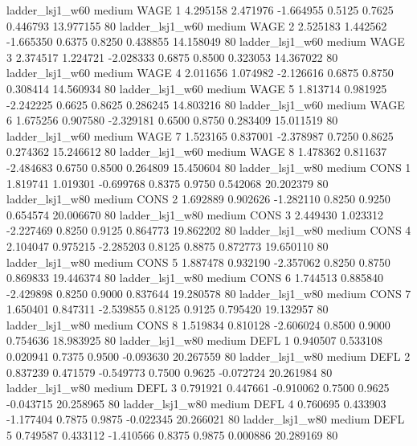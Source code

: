        ladder_lsj1_w60     medium     WAGE                 1  4.295158 2.471976 -1.664955 0.5125 0.7625  0.446793   13.977155 80
       ladder_lsj1_w60     medium     WAGE                 2  2.525183 1.442562 -1.665350 0.6375 0.8250  0.438855   14.158049 80
       ladder_lsj1_w60     medium     WAGE                 3  2.374517 1.224721 -2.028333 0.6875 0.8500  0.323053   14.367022 80
       ladder_lsj1_w60     medium     WAGE                 4  2.011656 1.074982 -2.126616 0.6875 0.8750  0.308414   14.560934 80
       ladder_lsj1_w60     medium     WAGE                 5  1.813714 0.981925 -2.242225 0.6625 0.8625  0.286245   14.803216 80
       ladder_lsj1_w60     medium     WAGE                 6  1.675256 0.907580 -2.329181 0.6500 0.8750  0.283409   15.011519 80
       ladder_lsj1_w60     medium     WAGE                 7  1.523165 0.837001 -2.378987 0.7250 0.8625  0.274362   15.246612 80
       ladder_lsj1_w60     medium     WAGE                 8  1.478362 0.811637 -2.484683 0.6750 0.8500  0.264809   15.450604 80
       ladder_lsj1_w80     medium     CONS                 1  1.819741 1.019301 -0.699768 0.8375 0.9750  0.542068   20.202379 80
       ladder_lsj1_w80     medium     CONS                 2  1.692889 0.902626 -1.282110 0.8250 0.9250  0.654574   20.006670 80
       ladder_lsj1_w80     medium     CONS                 3  2.449430 1.023312 -2.227469 0.8250 0.9125  0.864773   19.862202 80
       ladder_lsj1_w80     medium     CONS                 4  2.104047 0.975215 -2.285203 0.8125 0.8875  0.872773   19.650110 80
       ladder_lsj1_w80     medium     CONS                 5  1.887478 0.932190 -2.357062 0.8250 0.8750  0.869833   19.446374 80
       ladder_lsj1_w80     medium     CONS                 6  1.744513 0.885840 -2.429898 0.8250 0.9000  0.837644   19.280578 80
       ladder_lsj1_w80     medium     CONS                 7  1.650401 0.847311 -2.539855 0.8125 0.9125  0.795420   19.132957 80
       ladder_lsj1_w80     medium     CONS                 8  1.519834 0.810128 -2.606024 0.8500 0.9000  0.754636   18.983925 80
       ladder_lsj1_w80     medium     DEFL                 1  0.940507 0.533108  0.020941 0.7375 0.9500 -0.093630   20.267559 80
       ladder_lsj1_w80     medium     DEFL                 2  0.837239 0.471579 -0.549773 0.7500 0.9625 -0.072724   20.261984 80
       ladder_lsj1_w80     medium     DEFL                 3  0.791921 0.447661 -0.910062 0.7500 0.9625 -0.043715   20.258965 80
       ladder_lsj1_w80     medium     DEFL                 4  0.760695 0.433903 -1.177404 0.7875 0.9875 -0.022345   20.266021 80
       ladder_lsj1_w80     medium     DEFL                 5  0.749587 0.433112 -1.410566 0.8375 0.9875  0.000886   20.289169 80
